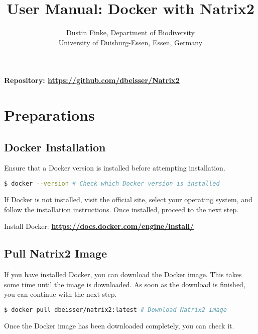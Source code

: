 \documentclass[a4paper,11pt]{article}
\title{User Manual: Docker with Natrix2}
\author{Dustin Finke, Department of Biodiversity \\ University of Duisburg-Essen, Essen, Germany}
\date{}
\newcommand{\vsp}{\vspace{0.2cm}}
\begin{document}
\maketitle

\vspace{-0.7cm}
\begin{center}
    \textbf{\fontsize{12}{13}\selectfont Repository: \uline{\href{https://github.com/dbeisser/Natrix2}{https://github.com/dbeisser/Natrix2}}}
\end{center}

\tableofcontents

\newpage

\section{Preparations}

\subsection{Docker Installation}

\noindent
Ensure that a Docker version is installed before attempting installation.

\begin{lstlisting}[language=bash]
$ docker --version # Check which Docker version is installed
\end{lstlisting}
\vsp

\noindent
If Docker is not installed, visit the official site, select your operating system, and follow the installation instructions. Once installed, proceed to the next step.
 \vsp
 
 \noindent
 Install Docker:
 \textbf{\uline{\href{https://docs.docker.com/engine/install/}{https://docs.docker.com/engine/install/}}}

\subsection{Pull Natrix2 Image}

\noindent
If you have installed Docker, you can download the Docker image. This takes some time until the image is downloaded. As soon as the download is finished, you can continue with the next step.

\begin{lstlisting}[language=bash]
$ docker pull dbeisser/natrix2:latest # Download Natrix2 image
\end{lstlisting}
\vsp
Once the Docker image has been downloaded completely, you can check it.
\end{document}
